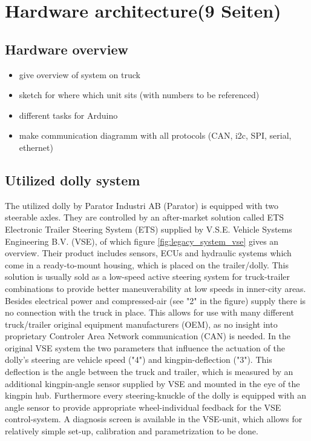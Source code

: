 \documentclass[ExampleMasters.tex]{subfiles}
\begin{document}
\clearpage


\chapter{Hardware architecture(9 Seiten)}
\label{chap:hardware_setup}

\section{Hardware overview}

\begin{itemize}
	\item give overview of system on truck
	\item sketch for where which unit sits (with numbers to be referenced)
	\item different tasks for Arduino
	\item make communication diagramm with all protocols (CAN, i2c, SPI, serial, ethernet)
	
\end{itemize}
\section{Utilized dolly system}
\label{sec:dolly_system}
The utilized dolly by Parator Industri AB (Parator) is equipped with two steerable axles. They are controlled by an after-market solution called ETS Electronic Trailer Steering System (ETS) supplied by V.S.E. Vehicle Systems Engineering B.V. (VSE), of which figure \ref{fig:legacy_system_vse} gives an overview. Their product includes sensors, ECUs and hydraulic systems which come in a ready-to-mount housing, which is placed on the trailer/dolly. This solution is usually sold as a low-speed active steering system for truck-trailer combinations to provide better maneuverability at low speeds in inner-city areas. Besides electrical power and compressed-air (see "2" in the figure) supply there is no connection with the truck in place. This allows for use with many different truck/trailer original equipment manufacturers (OEM), as no insight into proprietary Controler Area Network communication (CAN) is needed. In the original VSE system the two parameters that influence the actuation of the dolly's steering are vehicle speed ("4") and kingpin-deflection ("3"). This deflection is the angle between the truck and trailer, which is measured by an additional kingpin-angle sensor supplied by VSE and mounted in the eye of the kingpin hub. Furthermore every steering-knuckle of the dolly is equipped with an angle sensor to provide appropriate wheel-individual feedback for the VSE control-system. A diagnosis screen is available in the VSE-unit, which allows for relatively simple set-up, calibration and parametrization to be done.\cite{dolly_datasheet}
\end{document}
